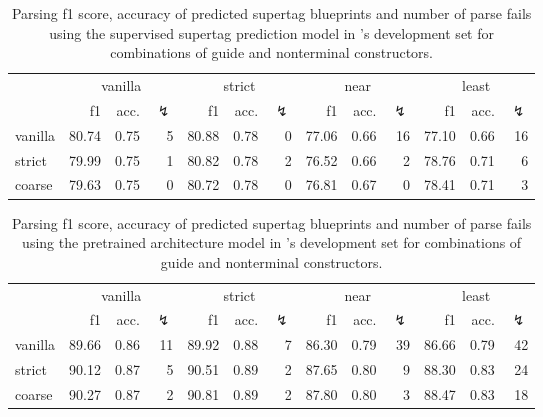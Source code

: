 \documentclass[../../document.tex]{subfiles}
\begin{document}
    \begin{table}
        \caption{\label{tbl:gridsearch:1:2}
            Parsing f1 score, accuracy of predicted supertag blueprints and number of parse fails using the supervised supertag prediction model in \negra{}'s development set for combinations of guide and nonterminal constructors.
        }
        \centering
        \vspace{.2cm}
        \begin{tabular}{l|rrr|rrr|rrr|rrr}
            \toprule
                        & \multicolumn{3}{c|}{vanilla} & \multicolumn{3}{c|}{strict} & \multicolumn{3}{c|}{near} & \multicolumn{3}{c}{least}  \\
                        & f1 & acc. & $\lightning$ & f1 & acc. & $\lightning$ & f1 & acc. & $\lightning$ & f1 & acc. & $\lightning$  \\ \hline
            vanilla     & 80.74 & 0.75 & 5 & 80.88 & 0.78 & 0 & 77.06 & 0.66 & 16 & 77.10 & 0.66 & 16 \\
            strict      & 79.99 & 0.75 & 1 & 80.82 & 0.78 & 2 & 76.52 & 0.66 &  2 & 78.76 & 0.71 &  6 \\
            coarse      & 79.63 & 0.75 & 0 & 80.72 & 0.78 & 0 & 76.81 & 0.67 &  0 & 78.41 & 0.71 &  3 \\
            \bottomrule
        \end{tabular}
    \end{table}
    
    
    \begin{table}
        \caption{\label{tbl:gridsearch:1:3}
            Parsing f1 score, accuracy of predicted supertag blueprints and number of parse fails using the pretrained architecture model in \negra{}'s development set for combinations of guide and nonterminal constructors.
        }
        \centering
        \vspace{.2cm}
        \begin{tabular}{l|rrr|rrr|rrr|rrr}
            \toprule
                        & \multicolumn{3}{c|}{vanilla} & \multicolumn{3}{c|}{strict} & \multicolumn{3}{c|}{near} & \multicolumn{3}{c}{least}  \\
                        & f1 & acc. & $\lightning$ & f1 & acc. & $\lightning$ & f1 & acc. & $\lightning$ & f1 & acc. & $\lightning$  \\ \hline
            vanilla     & 89.66 & 0.86 & 11 & 89.92 & 0.88 & 7 & 86.30 & 0.79 & 39 & 86.66 & 0.79 & 42 \\
            strict      & 90.12 & 0.87 &  5 & 90.51 & 0.89 & 2 & 87.65 & 0.80 &  9 & 88.30 & 0.83 & 24 \\
            coarse      & 90.27 & 0.87 &  2 & 90.81 & 0.89 & 2 & 87.80 & 0.80 &  3 & 88.47 & 0.83 & 18 \\
            \bottomrule
        \end{tabular}
    \end{table}
    
\end{document}
